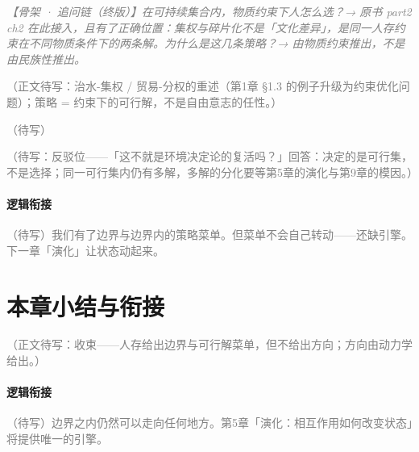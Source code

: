 \documentclass[../../main2.tex]{subfiles}
\begin{document}
	\textcolor{gray}{\textit{【骨架 · 追问链（终版）】在可持续集合内，物质约束下人怎么选？→ 原书 part2 ch2 在此接入，且有了正确位置：集权与碎片化不是「文化差异」，是同一人存约束在不同物质条件下的两条解。为什么是这几条策略？→ 由物质约束推出，不是由民族性推出。}}

	\textcolor{gray}{（正文待写：治水-集权 / 贸易-分权的重述（第1章 §1.3 的例子升级为约束优化问题）；策略 = 约束下的可行解，不是自由意志的任性。）}

	\begin{readingnote}
		\textcolor{gray}{（待写）}
	\end{readingnote}

	\begin{questionbox}
		\textcolor{gray}{（待写：反驳位——「这不就是环境决定论的复活吗？」回答：决定的是可行集，不是选择；同一可行集内仍有多解，多解的分化要等第5章的演化与第9章的模因。）}
	\end{questionbox}

	\paragraph*{逻辑衔接}
	\textcolor{gray}{（待写）我们有了边界与边界内的策略菜单。但菜单不会自己转动——还缺引擎。下一章「演化」让状态动起来。}

	\section{本章小结与衔接}
	\label{sec:surv-summary}

	\textcolor{gray}{（正文待写：收束——人存给出边界与可行解菜单，但不给出方向；方向由动力学给出。）}

	\paragraph*{逻辑衔接}
	\textcolor{gray}{（待写）边界之内仍然可以走向任何地方。第5章「演化：相互作用如何改变状态」将提供唯一的引擎。}
\end{document}
